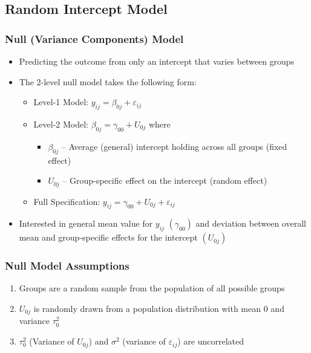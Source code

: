 \documentclass{beamer}
\begin{document}
\subsection{Random Intercept Model}

\begin{frame}
	\frametitle{Null (Variance Components) Model}
		\begin{itemize}
			\item Predicting the outcome from only an intercept that varies between groups
			\item The 2-level null model takes the following form:
				\begin{itemize}
					\item Level-1 Model: $y_{ij}=\beta_{0j}+\varepsilon_{ij}$
					\item Level-2 Model: $\beta_{0j}=\gamma_{00}+U_{0j}$ where
						\begin{itemize}
							\item $\beta_{0j}$ -- Average (general) intercept holding across all groups (fixed effect)
							\item $U_{0j}$ -- Group-specific effect on the intercept (random effect)
						\end{itemize}
					\item Full Specification: $y_{ij}=\gamma_{00}+U_{0j}+\varepsilon_{ij}$
				\end{itemize}
			\item Interested in general mean value for $y_{ij}$ $(\gamma_{00})$ and deviation between overall mean and group-specific effects for the intercept $(U_{0j})$
		\end{itemize}
\end{frame}

\begin{frame}
	\frametitle{Null Model Assumptions}
		\begin{enumerate}
			\item Groups are a random sample from the population of all possible groups
			\item $U_{0j}$ is randomly drawn from a population distribution with mean $0$ and variance $\tau^{2}_{0}$
			\item $\tau^{2}_{0}$ (Variance of $U_{0j}$) and $\sigma^2$ (variance of $\varepsilon_{ij}$) are uncorrelated
		\end{enumerate}
\end{frame}
\end{document}
